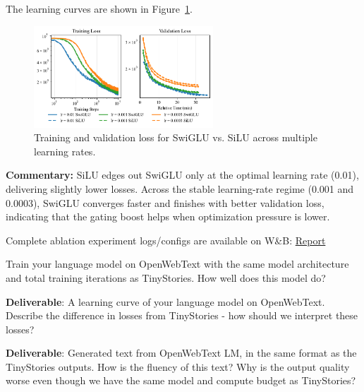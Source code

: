 \begin{answer}

The learning curves are shown in Figure~\ref{fig:swiglu_ablation}.

\begin{figure}[!htb]
    \centering
    \includegraphics[width=0.6\textwidth]{images/swiglu_ablation_experiments.pdf}
    \caption{Training and validation loss for SwiGLU vs. SiLU across multiple learning rates.}
    \label{fig:swiglu_ablation}
\end{figure}

\textbf{Commentary:} SiLU edges out SwiGLU only at the optimal learning rate (0.01), delivering slightly lower losses. Across the stable learning-rate regime (0.001 and 0.0003), SwiGLU converges faster and finishes with better validation loss, indicating that the gating boost helps when optimization pressure is lower.

\end{answer}

\begin{note}
    Complete ablation experiment logs/configs are available on W\&B: \href{https://wandb.ai/donglinkang2021-beijing-institute-of-technology/cs336-assignment1-basics/reports/Ablation-on-TinyStories--VmlldzoxNDY5OTY5Nw?accessToken=z269pk04blsko334xdyg3mrp5hxdvn2i6mt9bfpu4wf4hxyo9nlkmd2vfbahxmvq}{Report}
\end{note}


Train your language model on OpenWebText with the same model architecture and total training iterations as TinyStories. How well does this model do?

\textbf{Deliverable}: A learning curve of your language model on OpenWebText. Describe the difference in losses from TinyStories - how should we interpret these losses?

\textbf{Deliverable}: Generated text from OpenWebText LM, in the same format as the TinyStories outputs. How is the fluency of this text? Why is the output quality worse even though we have the same model and compute budget as TinyStories?

